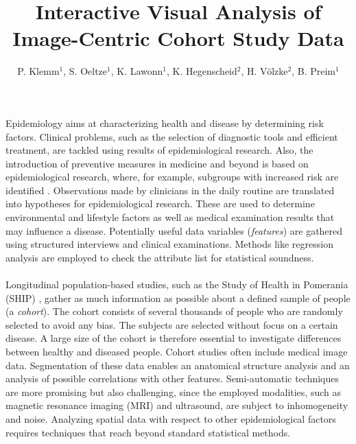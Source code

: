 \documentclass[journal]{style/vgtc} 			          %
\title{Interactive Visual Analysis of Image-Centric Cohort Study Data}
\author{P. Klemm$^{1}$, S. Oeltze$^{1}$, K. Lawonn$^{1}$, K. Hegenscheid$^{2}$, H. V{\"o}lzke$^{2}$, B. Preim$^{1}$}
\begin{document}


\maketitle

Epidemiology aims at characterizing health and disease by determining risk factors.
%
Clinical problems, such as the selection of diagnostic tools and efficient treatment, are tackled using results of epidemiological research.
%
Also, the introduction of preventive measures in medicine and beyond is based on epidemiological research, where, for example, subgroups with increased risk are identified \cite{Fletcher2012}.
%
Observations made by clinicians in the daily routine are translated into hypotheses for epidemiological research.
%
These are used to determine environmental and lifestyle factors as well as medical examination results that may influence a disease.
%
Potentially useful data variables (\emph{features}) are gathered using structured interviews and clinical examinations.
%
Methods like regression analysis are employed to check the attribute list for statistical soundness.
%
\\\\
Longitudinal population-based studies, such as the Study of Health in Pomerania (SHIP) \cite{Volzke2011}, gather as much information as possible about a defined sample of people (a \emph{cohort}).
%
The cohort consists of several thousands of people who are randomly selected to avoid any bias.
%
The subjects are selected without focus on a certain disease.
%
A large size of the cohort is therefore essential to investigate differences between healthy and diseased people.
%
%
Cohort studies often include medical image data.
Segmentation of these data enables an anatomical structure analysis and an analysis of possible correlations with other features.
%
Semi-automatic techniques are more promising but also challenging, since the employed modalities, such as magnetic resonance imaging (MRI) and ultrasound, are subject to inhomogeneity and noise.
%
Analyzing spatial data with respect to other epidemiological factors requires techniques that reach beyond standard statistical methods.
\end{document}
